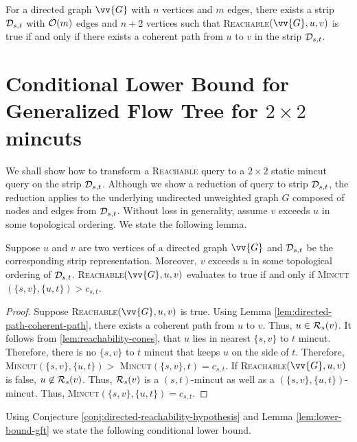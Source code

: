 \begin{lemma}
\label{lem:directed-path-coherent-path}
For a directed graph $\vv{G}$ with $n$ vertices and $m$ edges, there exists a strip ${\cal D}_{s,t}$ with ${\cal O}(m)$ edges and $n+2$ vertices such that \textsc{Reachable}$(\vv{G},u,v)$ is true if and only if there exists a coherent path from $u$ to $v$ in the strip ${\cal D}_{s,t}$.
\end{lemma}


\section{Conditional Lower Bound for Generalized Flow Tree for $2\times 2$ mincuts}

We shall show how to transform a \textsc{Reachable} query to a $2\times 2$ static mincut query on the strip ${\cal D}_{s,t}$. Although we show a reduction of query to strip ${\cal D}_{s,t}$, the reduction applies to the underlying undirected unweighted graph $G$ composed of nodes and edges from ${\cal D}_{s,t}$. Without loss in generality, assume $v$ exceeds $u$ in some topological ordering. We state the following lemma.

\begin{lemma}
\label{lem:lower-bound-gft}
Suppose $u$ and $v$ are two vertices of a directed graph $\vv{G}$ and ${\cal D}_{s,t}$ be the corresponding strip representation. Moreover, $v$ exceeds $u$ in some topological ordering of ${\cal D}_{s,t}$. \textsc{Reachable}$(\vv{G},u,v)$ evaluates to true if and only if \textsc{Mincut}$(\{s,v\},\{u,t\}) > c_{s,t}$.
\end{lemma}
\begin{proof}
Suppose \textsc{Reachable}$(\vv{G},u,v)$ is true. Using Lemma \ref{lem:directed-path-coherent-path}, there exists a coherent path from $u$ to $v$. Thus, $u \in {\cal R}_s(v)$. It follows from \ref{lem:reachability-cones}, that $u$ lies in nearest $\{s,v\}$ to $t$ mincut. Therefore, there is no $\{s,v\}$ to $t$ mincut that keeps $u$ on the side of $t$. Therefore, \textsc{Mincut}$(\{s,v\},\{u,t\}) >$ \textsc{Mincut}$(\{s,v\},t) = c_{s,t}$. If \textsc{Reachable}$(\vv{G},u,v)$ is false, $u \not\in {\cal R}_s(v)$. Thus, ${\cal R}_s(v)$ is a $(s,t)$-mincut as well as a $(\{s,v\},\{u,t\})$-mincut. Thus,  \textsc{Mincut}$(\{s,v\},\{u,t\}) = c_{s,t}$.
\end{proof}

Using Conjecture \ref{conj:directed-reachability-hypothesis} and Lemma \ref{lem:lower-bound-gft} we state the following conditional lower bound.

